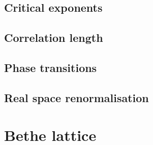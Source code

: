 \subsection{Critical exponents}

\subsection{Correlation length}

\subsection{Phase transitions}

\subsection{Real space renormalisation}



\section{Bethe lattice}\label{sec:2dgeneral}




